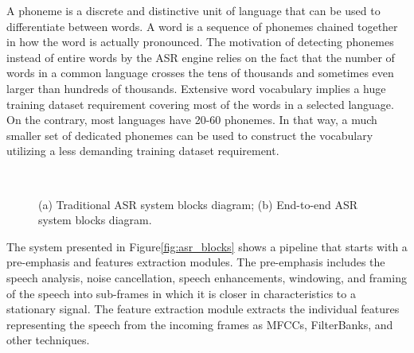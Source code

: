 A phoneme is a discrete and distinctive unit of language
that can be used to differentiate between words.
A word is a sequence of phonemes chained together in how the word is 
actually pronounced. 
The motivation of detecting phonemes instead of entire words by the ASR engine relies on the fact that the number of words in a common language crosses the tens of thousands and sometimes even larger than hundreds of thousands. 
Extensive word vocabulary implies a huge training dataset 
requirement covering most of the words in a selected language.
On the contrary, most languages have 20-60 phonemes\cite{Blust2013TerrorFT, dixon_1997}.
In that way, a much smaller set of dedicated phonemes can be used to construct the vocabulary utilizing a less demanding training dataset requirement.

\begin{figure}[H]
    \centering
    \\
    \caption{(a) Traditional ASR system blocks diagram;\;\;
        (b) End-to-end ASR system blocks diagram.}\label{fig:tr_e2e_asr_blocks} 
\end{figure}

The system presented in Figure\;\ref{fig:asr_blocks} 
shows a pipeline that starts with a pre-emphasis and features
extraction modules. 
The pre-emphasis includes the speech analysis, noise cancellation, speech enhancements, windowing, and framing of the speech into sub-frames in which it is closer in characteristics to a stationary signal.
The feature extraction module extracts the individual 
features representing the speech from the incoming frames 
as MFCCs, FilterBanks, and other techniques.

